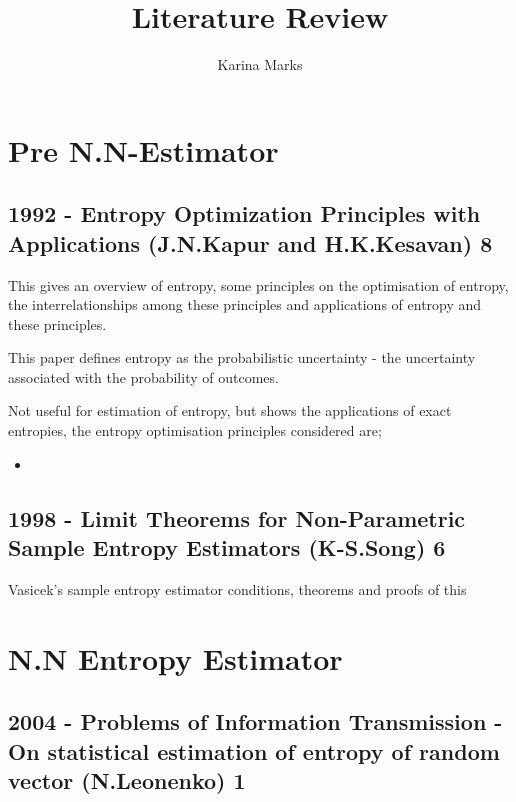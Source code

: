 \documentclass{article}
\title{Literature Review}
\author{Karina Marks}
\begin{document}
\maketitle
\section{Pre N.N-Estimator}
\subsection{1992 - Entropy Optimization Principles with Applications (J.N.Kapur and H.K.Kesavan) 8}

This gives an overview of entropy, some principles on the optimisation of entropy, the interrelationships among these principles and applications of entropy and these principles.

This paper defines entropy as the probabilistic uncertainty - the uncertainty associated with the probability of outcomes.

Not useful for estimation of entropy, but shows the applications of exact entropies, the entropy optimisation principles considered are;
\begin{itemize}
\item 
\end{itemize}

\subsection{1998 - Limit Theorems for Non-Parametric Sample Entropy Estimators (K-S.Song) 6}

Vasicek's sample entropy estimator
conditions, theorems and proofs of this


\section{N.N Entropy Estimator}

\subsection{2004 - Problems of Information Transmission - On statistical estimation of entropy of random vector (N.Leonenko) 1}
\end{document}
